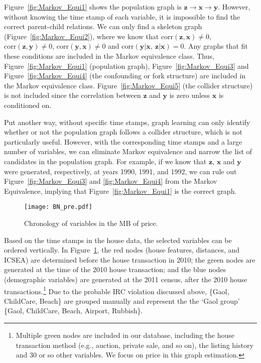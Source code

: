 \documentclass[11pt,review,authoryear]{elsarticle}
\begin{document}
Figure~\ref{fig:Markov_Equi1} shows the population graph is $\mathbf{z} \rightarrow \mathbf{x} \rightarrow \mathbf{y}$. However, without knowing the time stamp of each variable, it is impossible to find the correct parent-child relations. We can only find a skeleton graph (Figure~\ref{fig:Markov_Equi2}), where we know that $\mathrm{corr} \left( \mathbf{z}, \mathbf{x}\right) \neq 0$, $\mathrm{corr} \left( \mathbf{z}, \mathbf{y} \right) \neq 0$, $\mathrm{corr} \left( \mathbf{y}, \mathbf{x}\right) \neq 0$ and $\mathrm{corr} \left( \mathbf{y} \vert \mathbf{x}, \ \mathbf{z} \vert \mathbf{x} \right) = 0$. Any graphs that fit these conditions are included in the Markov equivalence class. Thus, Figure~\ref{fig:Markov_Equi1} (population graph), Figure~\ref{fig:Markov_Equi3} and Figure~\ref{fig:Markov_Equi4} (the confounding or fork structure) are included in the Markov equivalence class. Figure~\ref{fig:Markov_Equi5} (the collider structure) is not included since the correlation between $\mathbf{z}$ and $\mathbf{y}$ is zero unless $\mathbf{x}$ is conditioned on.

Put another way, without specific time stamps, graph learning can only identify whether or not the population graph follows a collider structure, which is not particularly useful. However, with the corresponding time stamps and a large number of variables, we can eliminate Markov equivalence and narrow the list of candidates in the population graph. For example, if we know that $\mathbf{z}$, $\mathbf{x}$ and $\mathbf{y}$ were generated, respectively, at years 1990, 1991, and 1992, we can rule out Figure~\ref{fig:Markov_Equi3} and \ref{fig:Markov_Equi4} from the Markov Equivalence, implying that Figure~\ref{fig:Markov_Equi1} is the correct graph.

\begin{figure}[H]
  \centering
  \texttt{[image: BN\_pre.pdf]}
  \caption{Chronology of variables in the MB of price.}
  \label{fig:BN_pre}
\end{figure}

Based on the time stamps in the house data, the selected variables can be ordered vertically. In Figure~\ref{fig:BN_pre}, the red nodes (house features, distances, and ICSEA) are determined before the house transaction in 2010; the green nodes are generated at the time of the 2010 house transaction; and the blue nodes (demographic variables) are generated at the 2011 census, after the 2010 house transactions.\footnote{Multiple green nodes are included in our database, including the house transaction method (e.g., auction, private sale, and so on), the listing history and 30 or so other variables. We focus on price in this graph estimation.}
Due to the probable IRC violation discussed above, \{Gaol, ChildCare, Beach\} are grouped manually and represent the the `Gaol group' \{Gaol, ChildCare, Beach, Airport, Rubbish\}.
\end{document}
